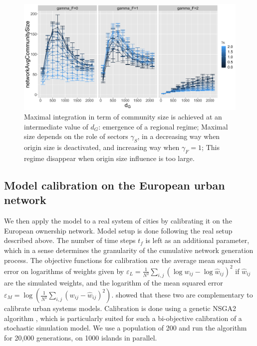 \documentclass[11pt]{article}
\begin{document}
\begin{figure}
    \includegraphics[width=\textwidth]{figures/networkAvgCommunitySize_countryGravityDecay2100_gammaDestination0_facetwrapgammaOrigin_colorgammaSectors.png}
	\caption{Maximal integration in term of community size is achieved at an intermediate value of $d_G$: emergence of a regional regime; Maximal size depends on the role of sectors $\gamma_S$, in a decreasing way when origin size is deactivated, and increasing way when $\gamma_F=1$; This regime disappear when origin size influence is too large.\label{fig:comsize}}
\end{figure}




\subsection{Model calibration on the European urban network}


We then apply the model to a real system of cities by calibrating it on the European ownership network. Model setup is done following the real setup described above. The number of time steps $t_f$ is left as an additional parameter, which in a sense determines the granularity of the cumulative network generation process. The objective functions for calibration are the average mean squared error on logarithms of weights given by $\varepsilon_L = \frac{1}{N^2} \sum_{i,j} \left(\log w_{ij} - \log \hat{w}_{ij} \right)^2$ if $\hat{w}_{ij}$ are the simulated weights, and the logarithm of the mean squared error $\varepsilon_M = \log\left(\frac{1}{N^2} \sum_{i,j} \left(w_{ij} - \hat{w}_{ij}\right)^2 \right)$. \cite{raimbault2018indirect} showed that these two are complementary to calibrate urban systems models. Calibration is done using a genetic NSGA2 algorithm \cite{deb2002fast}, which is particularly suited for such a bi-objective calibration of a stochastic simulation model. We use a population of 200 and run the algorithm for 20,000 generations, on 1000 islands in parallel.
\end{document}
